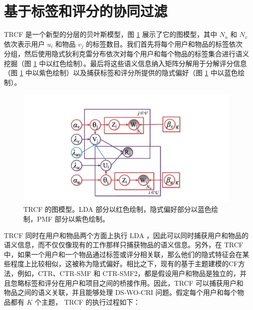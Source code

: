 \section{基于标签和评分的协同过滤}
TRCF 是一个新型的分层的贝叶斯模型，图 \ref{fig:fig2} 展示了它的图模型，其中 $N_u$ 和 $N_v$ 依次表示用户 $u_i$ 和物品 $v_j$ 的标签数目。我们首先将每个用户和物品的标签依次分组，然后使用隐式狄利克雷分布依次对每个用户和每个物品的标签集合进行语义挖掘（图 \ref{fig:fig2} 中以红色绘制）。最后将这些语义信息纳入矩阵分解用于分解评分信息（图 \ref{fig:fig2} 中以紫色绘制）以及捕获标签和评分所提供的隐式偏好（图 \ref{fig:fig2} 中以蓝色绘制）。
\begin{figure}
\includegraphics[width=\linewidth]{images/figure2.jpg}
\caption{TRCF 的图模型。LDA 部分以红色绘制，隐式偏好部分以蓝色绘制，PMF 部分以紫色绘制。}
\label{fig:fig2}
\end{figure}

TRCF 同时在用户和物品两个方面上执行 LDA ，因此可以同时捕获用户和物品的语义信息，而不仅仅像现有的工作那样只捕获物品的语义信息。另外，在 TRCF 中，如果一个用户和一个物品通过标签或评分相关联，那么他们的隐式特征会在某些程度上比较相似，这被称为隐式偏好。相比之下，现有的基于主题建模的CF方法，例如，CTR、CTR-SMF 和 CTR-SMF2，都是假设用户和物品是独立的，并且忽略标签和评分在用户和项目之间的桥接作用。因此，TRCF 可以捕获用户和物品之间的语义关联，并且能够处理 DS-WO-CRI 问题。假定每个用户和每个物品都有 $K$ 个主题， TRCF 的执行过程如下：

